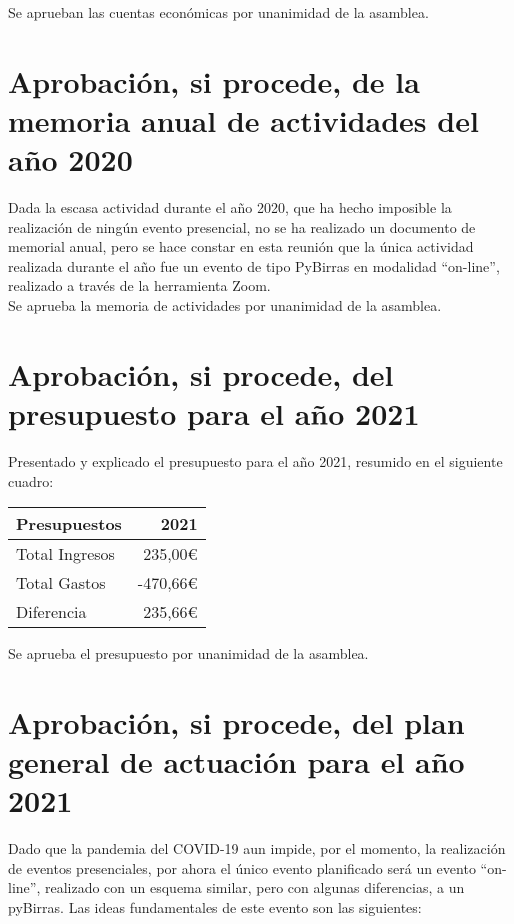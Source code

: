 \documentclass[a4paper,12pt]{article}
\begin{document}
Se aprueban las cuentas económicas por unanimidad de la asamblea.

\section{Aprobación, si procede, de la memoria anual de actividades del año 2020}

Dada la escasa actividad durante el año 2020, que ha hecho imposible la realización de ningún evento presencial, no se ha realizado un documento de memorial anual, pero se hace constar en esta reunión que la única actividad realizada durante el año fue un evento de tipo PyBirras en modalidad ``on-line'', realizado a través de la herramienta Zoom.\\

Se aprueba la memoria de actividades por unanimidad de la asamblea.

\section{Aprobación, si procede, del presupuesto para el año 2021}

Presentado y explicado el presupuesto para el año 2021, resumido
en el siguiente cuadro:

\begin{center}
    \begin{tabular}{ | l | r | }
        \hline
        \textbf{Presupuestos} & \textbf{2021} \\ 
        \hline
        Total Ingresos & 235,00\euro \\  
        \hline
        Total Gastos & -470,66\euro \\  
        \hline
        \hline
        Diferencia & 235,66\euro \\  
        \hline
    \end{tabular}
\end{center}

Se aprueba el presupuesto por unanimidad de la asamblea.

\section{Aprobación, si procede, del plan general de actuación para el año 2021}

Dado que la pandemia del COVID-19 aun impide, por el momento, la realización de eventos presenciales, por ahora el único evento planificado será un evento ``on-line'', realizado con un esquema similar, pero con algunas diferencias, a un pyBirras. Las ideas fundamentales de este evento son las siguientes:
\end{document}
